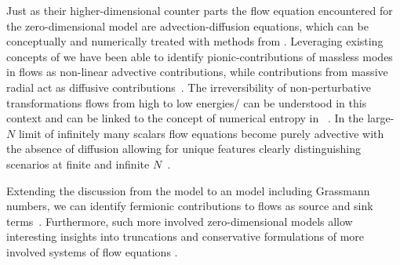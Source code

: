 Just as their higher-dimensional counter parts the flow equation encountered for the zero-dimensional \ON{} model are advection-diffusion equations, which can be conceptually and numerically treated with methods from \cfd{}.
Leveraging existing concepts of \cfd{} we have been able to identify pionic-contributions of massless modes in \frg{} flows as non-linear advective contributions, while contributions from massive radial \sigmaModes{} act as diffusive contributions~\cite{zerod1}.
The irreversibility of non-perturbative \rg{} transformations \dash{} \frg{} flows from high to low energies/\rgscales{} \dash{} can be understood in this context and can be linked to the concept of numerical entropy in \cfd{}~\cite{zerod2}.
In the large-$N$ limit of infinitely many scalars \frg{} flow equations become purely advective with the absence of diffusion allowing for unique features clearly distinguishing scenarios at finite and infinite $N$~\cite{zerod3}.

Extending the discussion from the \ON{} model to an  model including Grassmann numbers, we can identify fermionic contributions to \frg{} flows as source and sink terms~\cite{zerod4}.
Furthermore, such more involved zero-dimensional models allow interesting insights into truncations and conservative formulations of more involved systems of \frg{} flow equations \nolinebreak[3]\cite{zerod4}.

